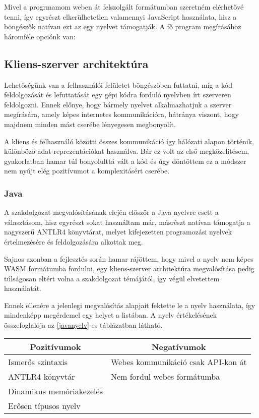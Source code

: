 Mivel a progrmamom weben át felszolgált formátumban szeretném elérhetővé tenni, így egyrészt elkerülhetetlen valamennyi JavaScript használata, hisz a böngészők natívan ezt az egy nyelvet támogatják. A fő program megírásához háromféle opciónk van:

\subsection{Kliens-szerver architektúra}

Lehetőségünk van a felhasználói felületet böngészőben futtatni, míg a kód feldolgozását és lefuttatását egy gépi kódra forduló nyelvben írt szerveren feldolgozni. Ennek előnye, hogy bármely nyelvet alkalmazhatjuk a szerver megírására, amely képes internetes kommunikációra, hátránya viszont, hogy majdnem minden mást cserébe lényegesen megbonyolít.

A kliens és felhasználó közötti összes kommunikáció így hálózati alapon történik, különböző adat-reprezentációkat használva. Bár ez volt az első megközelítésem, gyakorlatban hamar túl bonyolulttá vált a kód és úgy döntöttem ez a módszer nem nyújt elég pozitívumot a komplexitásért cserébe. 

\subsubsection{Java}

A szakdolgozat megvalósításának elején először a Java nyelvre esett a választásom, hisz egyrészt sokat használtam már, másrészt natívan támogatja a nagyszerű ANTLR4 könyvtárat, melyet kifejezetten programozási nyelvek értelmezésére és feldolgozására alkottak meg.\cite{antlr-book}

Sajnos azonban a fejlesztés során hamar rájöttem, hogy mivel a nyelv nem képes WASM formátumba fordulni, egy kliens-szerver architektúra megvalósítása pedig túlságosan eltért volna a szakdolgozat témájától, így végül elvetettem használatát.

Ennek ellenére a jelenlegi megvalósítás alapjait fektette le a nyelv használata, így mindenképp megérdemel egy helyet a listában. A nyelv értékelésének összefoglalója az \ref{javanyelv}-es táblázatban látható.

\begin{center}
  \begin{tabularx}{\textwidth}{X X}
    \hline
    \multicolumn{1}{c}{\bfseries{Pozitívumok}}         & \multicolumn{1}{c}{\bfseries{Negatívumok}} \\
    \hline
    Ismerős szintaxis & Webes kommunikáció csak API-kon át \\
    ANTLR4 könyvtár & Nem fordul webes formátumba \\
    Dinamikus memóriakezelés \\
    Erősen típusos nyelv \\
    \hline
  \end{tabularx}
\end{center}

